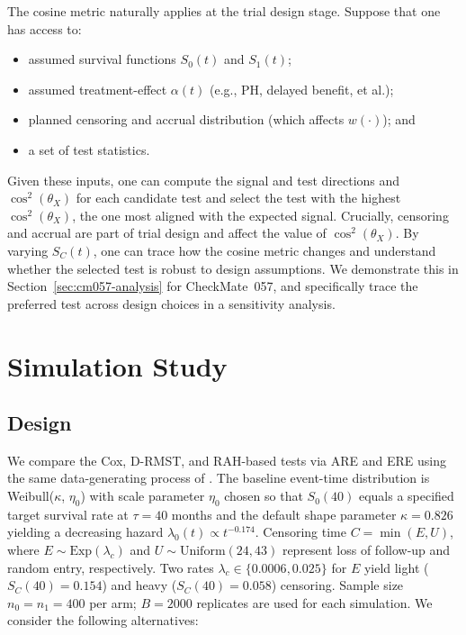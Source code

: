 \documentclass[12pt]{article}
\newcommand{\TauSim}{40}
\newcommand{\ScTauLight}{0.154}
\newcommand{\ScTauHeavy}{0.058}
\begin{document}
The cosine metric naturally applies at the trial design stage. Suppose that one has access to:
\begin{itemize}
\item assumed survival functions $S_0(t)$ and $S_1(t)$;
\item assumed treatment-effect $\alpha(t)$ (e.g., PH, delayed
benefit, et al.);
\item planned censoring and accrual distribution (which affects $w(\cdot)$); and
\item a set of test statistics.
\end{itemize}
Given these inputs, one can compute the signal and test directions and $\cos^2(\theta_X)$ for each candidate test and select the test with the highest $\cos^2(\theta_X)$, the one most aligned with the expected signal. Crucially, censoring and accrual are part of trial design and affect the value of $\cos^2(\theta_X).$ By varying $S_C(t)$, one can trace how the cosine metric changes and understand whether the selected test is robust to design assumptions. We demonstrate this in Section~\ref{sec:cm057-analysis} for CheckMate~057, and specifically trace the preferred test across design choices in a sensitivity analysis.




\section{Simulation Study}
\label{sec:sim}

\subsection{Design}
\label{sec:sim-design}

We compare the Cox, D-RMST, and RAH-based tests via ARE and ERE using the
same data-generating process of \citet{Tian2018}.
The baseline event-time distribution is Weibull($\kappa$, $\eta_0$)
with scale parameter $\eta_0$ chosen so that $S_0(\TauSim)$ equals a specified target survival rate at $\tau=\TauSim$ months and the default shape parameter $\kappa=0.826$ yielding a decreasing hazard
$\lambda_0(t)\propto t^{-0.174}$.
Censoring time $C=\min(E,U)$, where $E\sim\mathrm{Exp}(\lambda_c)$ and
$U\sim\mathrm{Uniform}(24,43)$ represent loss of follow-up and random entry, respectively. Two rates $\lambda_c\in\{0.0006,0.025\}$ for $E$
yield light ($S_C(\TauSim)=\ScTauLight$) and heavy ($S_C(\TauSim)=\ScTauHeavy$)
censoring.
Sample size $n_0=n_1=400$ per arm; $B=2000$ replicates are used for each simulation. We consider the following alternatives:
\end{document}
